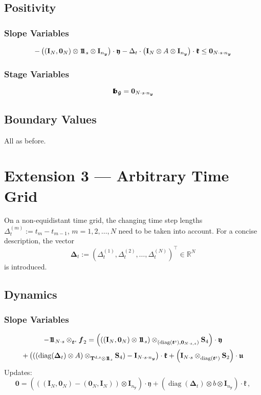 \documentclass{article}
\newcommand{\defeq}{\mathrel{:=}}%
\newcommand{\tp}{\top}%
\newcommand{\kron}{\otimes}%
\newcommand{\dkron}[2][]{\mathbin{\kron_{#2}^{#1}}}%
\newcommand{\setR}{\mathbb{R}}%
\newcommand{\diag}{\mathop{\mathrm{diag}}}%
\newcommand{\vectorfont}[1]{\boldsymbol{#1}}%
\newcommand{\greekvectorfont}[1]{\boldsymbol{#1}}%
\newcommand{\matrixfont}[1]{\mathbf{#1}}%
\newcommand{\fvec}{\vectorfont{f}}
\newcommand{\tvec}{\vectorfont{t}}
\newcommand{\yvec}{\vectorfont{y}}
\newcommand{\tildeyvec}{\vectorfont{\tilde{y}}}
\newcommand{\Deltavec}{\greekvectorfont{\Delta}}
\newcommand{\kfrakvec}{\vectorfont{\mathfrak{k}}}
\newcommand{\ufrakvec}{\vectorfont{\mathfrak{u}}}
\newcommand{\yfrakvec}{\vectorfont{\mathfrak{y}}}
\newcommand{\nullvec}{\greekvectorfont{0}}
\newcommand{\lbfrakvec}{\vectorfont{\mathfrak{l\negthinspace b}}}
\newcommand{\einsvec}{\vectorfont{1}\negthinspace\negthinspace\vectorfont{1}} %
\newcommand{\Imat}{\matrixfont{I}}%
\newcommand{\Smat}{\matrixfont{S}}
\newcommand{\Tmat}{\matrixfont{T}}
\newcommand{\Nullmat}{\matrixfont{0}}
\begin{document}
\subsection*{Positivity}
\subsubsection*{Slope Variables}
\[
- \left((\Imat_N, \nullvec_N)  \kron \einsvec_s  \kron \Imat_{n_{\yvec}}   \right)\cdot \yfrakvec
- \Delta_t \cdot \left( \Imat_N \kron A \kron \Imat_{n_{\yvec}}  \right) \cdot \kfrakvec
\leq \nullvec_{N \cdot s \cdot n_{\yvec}}
\]
\subsubsection*{Stage Variables}
\[
\lbfrakvec_{\tildeyvec} = \nullvec_{N \cdot s \cdot n_{\yvec}}
\]

\subsection*{Boundary Values}
All as before.



%

\section*{Extension 3 --- Arbitrary Time Grid}

On a non-equidistant time grid, the changing time step lengths $\Delta_t^{(m)} \defeq t_m - t_{m-1}$, $m = 1,2,\ldots, N$ need to be taken into account.
For a concise description, the vector
\[
\Deltavec_t \defeq (\Delta_t^{(1)}, \Delta_t^{(2)}, \ldots, \Delta_t^{(N)})^{\tp} \in \setR^N
\]
is introduced.


\subsection*{Dynamics}
\subsubsection*{Slope Variables}
\begin{multline*}
-\einsvec_{N\cdot s} \dkron{\tvec^{\mathrm{s}}} \fvec_2 
=
\left( \left( (\Imat_N, \nullvec_N) \kron \einsvec_s \right) \dkron{(\diag (\tvec^{\mathrm{s}}), \Nullmat_{N \cdot s,s})} \Smat_4 \right) \cdot \yfrakvec 
\\
+ \left( ((\diag(\Deltavec_t) \kron A) \dkron{\Tmat^{\mathrm{d}, \mathrm{s}} \kron \einsvec_s} \Smat_4)   - \Imat_{N\cdot s \cdot n_{\yvec}}\right) \cdot \kfrakvec
+ \left( \Imat_{N \cdot s} \dkron{\diag(\tvec^{\mathrm{s}})}  \Smat_2\right) \cdot \ufrakvec 
\end{multline*}
Updates:
\[
\nullvec 
=
\left(
((\Imat_N, \nullvec_N) - (\nullvec_N, \Imat_N)) \kron \Imat_{n_{\yvec}}
\right) \cdot \yfrakvec 
+   (\diag(\Deltavec_t) \kron b \kron \Imat_{n_{\yvec}}) \cdot \kfrakvec\,,
\]
\end{document}
